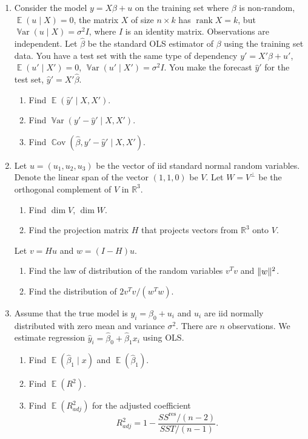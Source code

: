 \documentclass[12pt]{article}
\DeclareMathOperator{\rank}{rank}
\DeclareMathOperator{\Cov}{\mathbb{C}ov}
\DeclareMathOperator{\Var}{\mathbb{V}ar}
\DeclarePairedDelimiter{\norm}{\lVert}{\rVert}
\DeclareMathOperator{\E}{\mathbb{E}}
\newcommand{\SSR}{SS^{\text{res}}}
\newcommand{\SST}{SST}
\newcommand{\hb}{\hat\beta}
\newcommand \RR{\mathbb{R}}
\begin{document}
\begin{enumerate}
    \item Consider the model $y = X\beta + u$ on the training set where $\beta$ is non-random,
    $\E(u \mid X) = 0$, the matrix $X$ of size $n\times k$ has $\rank X = k$, 
    but $\Var(u \mid X) = \sigma^2 I$, where $I$ is an identity matrix. 
    Observations are independent. 
    Let $\hb$ be the standard OLS estimator of $\beta$ using the training set data. 
    You have a test set with the same type of dependency $y' = X' \beta + u'$,
    $\E(u' \mid X') = 0$, $\Var(u' \mid X') = \sigma^2 I$.
    You make the forecast $\hat y'$ for the test set, $\hat y' = X' \hat\beta$.

    \begin{enumerate}
        \item Find $\E(\hat y' \mid X, X')$.
        \item Find $\Var(y' - \hat y' \mid X, X')$.
        \item Find $\Cov(\hb, y' - \hat y' \mid X, X')$.
    \end{enumerate}

    \item Let $u = (u_1, u_2, u_3)$ be the vector of iid standard normal random variables. 
    Denote the linear span of the vector $(1, 1, 0)$ be $V$.
    Let $W = V^{\perp}$ be the orthogonal complement of $V$ in $\RR^3$. 

    \begin{enumerate}
        \item Find $\dim V$, $\dim W$.
        \item Find the projection matrix $H$ that projects vectors from $\RR^3$ onto $V$.
    \end{enumerate}
    Let $v = Hu$ and $w = (I - H)u$.
    \begin{enumerate}[resume]
        \item Find the law of distribution of the random variables $v^T v$ and $\norm{w}^2$.
        \item Find the distribution of $2v^Tv/(w^Tw)$.
    \end{enumerate}

    \item Assume that the true model is $y_i = \beta_0 +  u_i$ and $u_i$ are iid normally distributed with zero mean and variance $\sigma^2$.
    There are $n$ observations.
    We estimate regression $\hat y_i = \hat \beta_0 + \hat\beta_1 x_i$ using OLS.

    \begin{enumerate}
        \item Find $\E(\hat \beta_1 \mid x)$  and $\E(\hat\beta_1)$.
        \item Find $\E(R^2)$.
        \item Find $\E(R^2_{adj})$ for the adjusted coefficient 
        \[
            R^2_{adj} = 1 - \frac{\SSR / (n - 2)}{\SST / (n - 1)}.
        \]
        
    \end{enumerate}

\end{enumerate}
\end{document}
